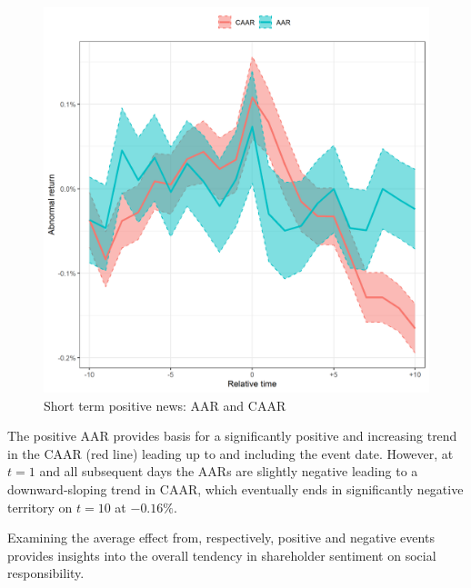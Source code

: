 \begin{figure} [H] 
    \centering
    \includegraphics[scale=0.6]{Projekt/1.Figures analysis/ST_positive_all_CI.png}
    \caption{Short term positive news: AAR and CAAR}
    \label{fig:ST_pos_news}
\end{figure}

The positive AAR provides basis for a significantly positive and increasing trend in the CAAR (red line) leading up to and including the event date. However, at $t = 1$ and all subsequent days the AARs are slightly negative leading to a downward-sloping trend in CAAR, which eventually ends in significantly negative territory on $t = 10$ at $-0.16\%$.

 Examining the average effect from, respectively, positive and negative events provides insights into the overall tendency in shareholder sentiment on social responsibility. 

